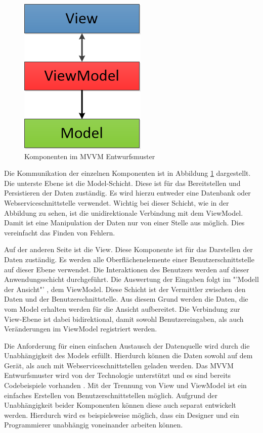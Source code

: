 \begin{figure}
\centering
\includegraphics{images/mvvm}
\caption{Komponenten im MVVM Entwurfsmuster}
\label{mvvm}
\end{figure}
Die Kommunikation der einzelnen Komponenten ist in Abbildung \ref{mvvm} dargestellt. Die unterste Ebene ist die Model-Schicht. Diese ist für das Bereitstellen und Persistieren der Daten zuständig. Es wird hierzu entweder eine Datenbank oder Webserviceschnittstelle verwendet. Wichtig bei dieser Schicht, wie in der Abbildung zu sehen, ist die unidirektionale Verbindung mit dem ViewModel. Damit ist eine Manipulation der Daten nur von einer Stelle aus möglich. Dies vereinfacht das Finden von Fehlern. \par
Auf der anderen Seite ist die View. Diese Komponente ist für das Darstellen der Daten zuständig. Es werden alle Oberflächenelemente einer Benutzerschnittstelle auf dieser Ebene verwendet. Die Interaktionen des Benutzers werden auf dieser Anwendungsschicht durchgeführt. Die Auswertung der Eingaben folgt im "'Modell der Ansicht"' \cite[S.9]{bib:mvvm}, dem ViewModel. Diese Schicht ist der Vermittler zwischen den Daten und der Benutzerschnittstelle. Aus diesem Grund werden die Daten, die vom Model erhalten werden für die Ansicht aufbereitet. Die Verbindung zur View-Ebene ist dabei bidirektional, damit sowohl Benutzereingaben, als auch Veränderungen im ViewModel registriert werden.
\par 
Die Anforderung für einen einfachen Austausch der Datenquelle wird durch die Unabhängigkeit des Models erfüllt. Hierdurch können die Daten sowohl auf dem Gerät, als auch mit Webserviceschnittstellen geladen werden. Das MVVM Entwurfsmuster wird von der Technologie unterstützt und es sind bereits Codebeispiele vorhanden \cite{bib:winMvvm}. Mit der Trennung von View und ViewModel ist ein einfaches Erstellen von Benutzerschnittstellen möglich. Aufgrund der Unabhängigkeit beider Komponenten können diese auch separat entwickelt werden. Hierdurch wird es beispielsweise möglich, dass ein Designer und ein Programmierer unabhängig voneinander arbeiten können. 

